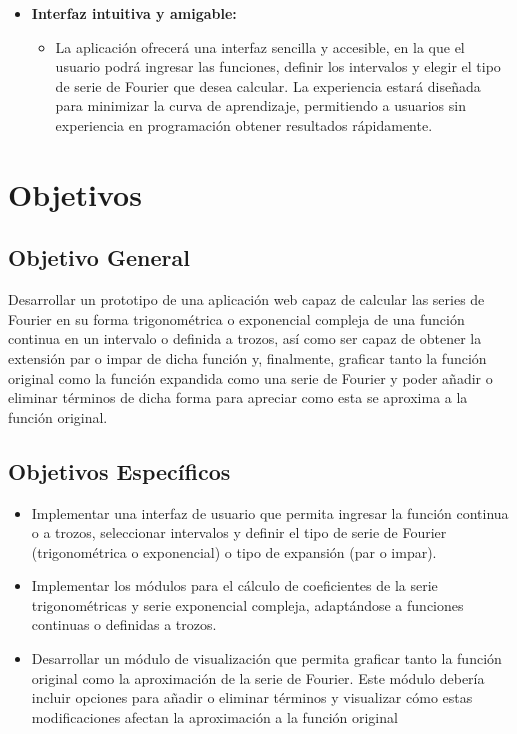 \begin{itemize}
	\item \textbf{Interfaz intuitiva y amigable:}
	\vspace{-10pt}
	\begin{itemize}
		\item  La aplicación ofrecerá una interfaz sencilla y accesible, en la que el usuario podrá ingresar las funciones, definir los intervalos y elegir el tipo de serie de Fourier que desea calcular. La experiencia estará diseñada para minimizar la curva de aprendizaje, permitiendo a usuarios sin experiencia en programación obtener resultados rápidamente.
	\end{itemize}
\end{itemize}

\section{Objetivos}
\subsection{Objetivo General}
Desarrollar un prototipo de una aplicación web capaz de calcular las series de Fourier en su forma trigonométrica o exponencial compleja de una función continua en un intervalo o definida a trozos, así como ser capaz de obtener la extensión par o impar de dicha función y, finalmente, graficar tanto la función original como la función expandida como una serie de Fourier y poder añadir o eliminar términos de dicha forma para apreciar como esta se aproxima a la función original.

\subsection{Objetivos Específicos}
\begin{itemize}
	\item Implementar una interfaz de usuario que permita ingresar la función continua o a trozos, seleccionar intervalos y definir el tipo de serie de Fourier (trigonométrica o exponencial) o tipo de expansión (par o impar).
	\item Implementar los módulos para el cálculo de coeficientes de la serie trigonométricas y serie exponencial compleja, adaptándose a funciones continuas o definidas a trozos.
	\item  Desarrollar un módulo de visualización que permita graficar tanto la función original como la
	aproximación de la serie de Fourier. Este módulo debería incluir opciones para añadir o eliminar términos y visualizar cómo estas modificaciones afectan la aproximación a la función original
\end{itemize}
